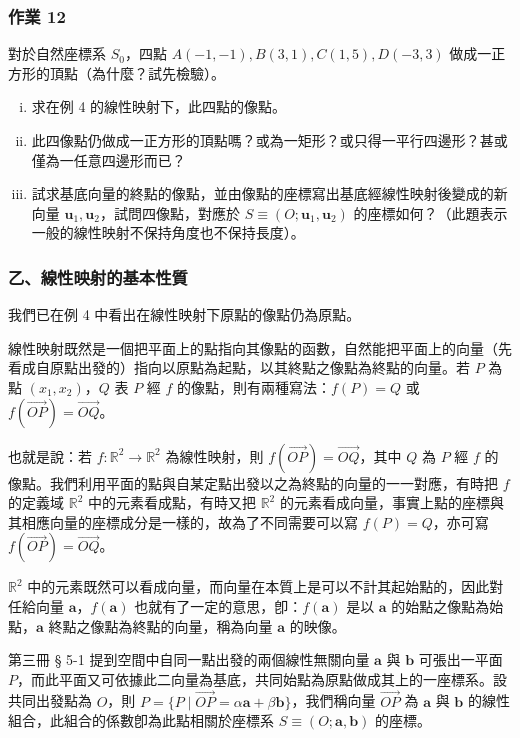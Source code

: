 \subsubsection*{作業 12}
對於自然座標系 $S_0$，四點 $A(-1, -1), B(3, 1), C(1, 5), D(-3, 3)$ 做成一正方形的頂點（為什麼？試先檢驗）。
\begin{enumerate}[(i)]
  \item 求在例 4 的線性映射下，此四點的像點。
  \item 此四像點仍做成一正方形的頂點嗎？或為一矩形？或只得一平行四邊形？甚或僅為一任意四邊形而已？
  \item 試求基底向量的終點的像點，並由像點的座標寫出基底經線性映射後變成的新向量 $\mathbf{u}_1, \mathbf{u}_2$，試問四像點，對應於 $S \equiv (O; \mathbf{u}_1, \mathbf{u}_2)$ 的座標如何？（此題表示一般的線性映射不保持角度也不保持長度）。
\end{enumerate}

\subsubsection*{乙、線性映射的基本性質}

我們已在例 4 中看出在線性映射下原點的像點仍為原點。

線性映射既然是一個把平面上的點指向其像點的函數，自然能把平面上的向量（先看成自原點出發的）指向以原點為起點，以其終點之像點為終點的向量。若 $P$ 為點 $(x_1, x_2)$，$Q$ 表 $P$ 經 $f$ 的像點，則有兩種寫法：$f(P) = Q$ 或 $f(\vec{OP}) = \vec{OQ}$。

也就是說：若 $f: \mathbb{R}^2 \to \mathbb{R}^2$ 為線性映射，則 $f(\vec{OP}) = \vec{OQ}$，其中 $Q$ 為 $P$ 經 $f$ 的像點。我們利用平面的點與自某定點出發以之為終點的向量的一一對應，有時把 $f$ 的定義域 $\mathbb{R}^2$ 中的元素看成點，有時又把 $\mathbb{R}^2$ 的元素看成向量，事實上點的座標與其相應向量的座標成分是一樣的，故為了不同需要可以寫 $f(P) = Q$，亦可寫 $f(\vec{OP}) = \vec{OQ}$。

$\mathbb{R}^2$ 中的元素既然可以看成向量，而向量在本質上是可以不計其起始點的，因此對任給向量 $\mathbf{a}$，$f(\mathbf{a})$ 也就有了一定的意思，卽：$f(\mathbf{a})$ 是以 $\mathbf{a}$ 的始點之像點為始點，$\mathbf{a}$ 終點之像點為終點的向量，稱為向量 $\mathbf{a}$ 的映像。

第三冊 § 5-1 提到空間中自同一點出發的兩個線性無關向量 $\mathbf{a}$ 與 $\mathbf{b}$ 可張出一平面 $P$，而此平面又可依據此二向量為基底，共同始點為原點做成其上的一座標系。設共同出發點為 $O$，則 $P = \{P \mid \vec{OP} = \alpha\mathbf{a} + \beta\mathbf{b}\}$，我們稱向量 $\vec{OP}$ 為 $\mathbf{a}$ 與 $\mathbf{b}$ 的線性組合，此組合的係數卽為此點相關於座標系 $S \equiv (O; \mathbf{a}, \mathbf{b})$ 的座標。

